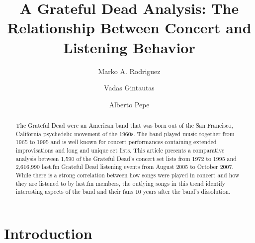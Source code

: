 \documentclass{svmult}
\begin{document}
\title*{A Grateful Dead Analysis: The Relationship Between Concert and Listening Behavior}
\author{Marko A. Rodriguez \and Vadas Gintautas \and Alberto Pepe}


\maketitle

\begin{abstract}
The Grateful Dead were an American band that was born out of the San Francisco, California psychedelic movement of the 1960s. The band played music together from 1965 to 1995 and is well known for concert performances containing extended improvisations and long and unique set lists. This article presents a comparative analysis between 1,590 of the Grateful Dead's concert set lists from 1972 to 1995 and 2,616,990 last.fm Grateful Dead listening events from August 2005 to October 2007. While there is a strong correlation between how songs were played in concert and how they are listened to by last.fm members, the outlying songs in this trend identify interesting aspects of the band and their fans 10 years after the band's dissolution.
\end{abstract}

\section{Introduction}
\end{document}
